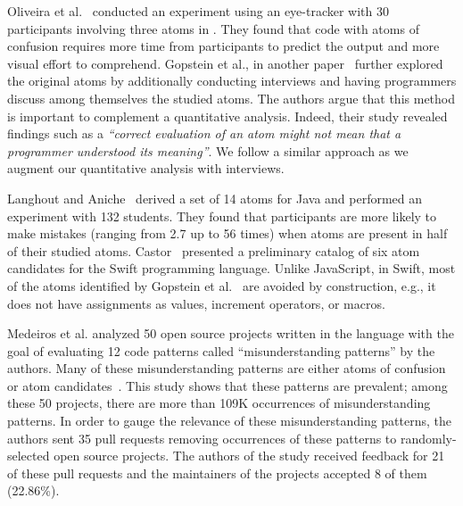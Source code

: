 Oliveira et al.~\cite{TheEyesDoNotLie} conducted an experiment using an eye-tracker with 30 participants involving three atoms in \clang. They found that code with atoms of confusion requires more time from participants to predict the output and more visual effort to comprehend. Gopstein et al., in another paper~\cite{ThinkingAloud} further explored the original atoms by additionally conducting interviews and having programmers discuss among themselves the studied atoms. The authors argue that this method is important to complement a quantitative analysis. Indeed, their study revealed findings such as a \textit{``correct evaluation of an atom might not mean that a programmer understood its meaning''}. We follow a similar approach as we augment our quantitative analysis with interviews.

Langhout and Aniche~\cite{Langhout:2021:ACJ} derived a set of 14 atoms for Java and performed an experiment with 132 students. They found that participants are more likely to make mistakes (ranging from 2.7 up to 56 times) when atoms are present in half of their studied atoms. Castor~\cite{castor2018} presented a preliminary catalog of six atom candidates for the Swift programming language. Unlike JavaScript, in Swift, most of the atoms identified by Gopstein et al.~\cite{DBLP:conf/sigsoft/GopsteinIYDZYC17} are avoided by construction, e.g., it does not have assignments as values, increment operators, or macros. 

Medeiros et al. \cite{DBLP:journals/ese/MedeirosLAAKRG19} analyzed 50 open source projects written in the \clang language with the goal of evaluating 12 code patterns called ``misunderstanding patterns'' by the authors. Many of these misunderstanding patterns are either atoms of confusion or atom candidates~\cite{DBLP:conf/sigsoft/GopsteinIYDZYC17}. This study shows that these patterns are prevalent; among these 50 projects, there are more than 109K occurrences of misunderstanding patterns. 
In order to gauge the relevance of these misunderstanding patterns, the authors sent 35 pull requests removing occurrences of these patterns to randomly-selected open source projects. The authors of the study received feedback for 21 of these pull requests and the maintainers of the projects accepted 8 of them (22.86\%). 

